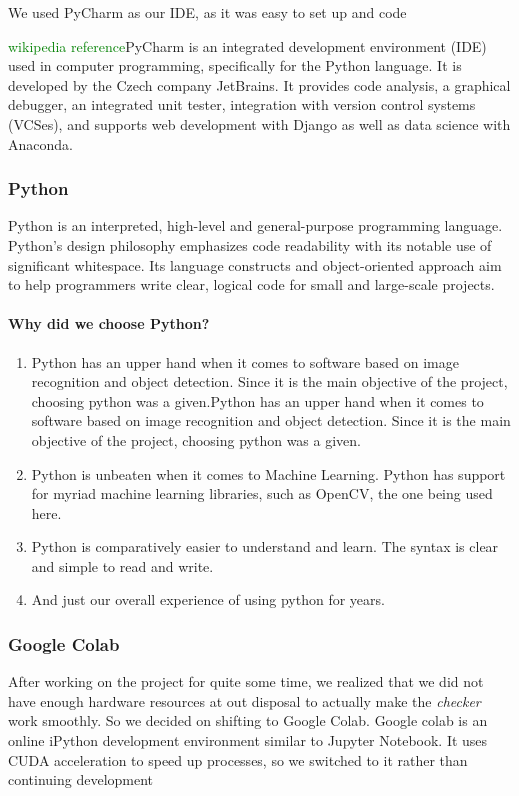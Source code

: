 \documentclass[a4paper]{article}
\begin{document}
We used PyCharm as our IDE, as it was easy to set up and code

\textcolor{green}{wikipedia reference}PyCharm is an integrated development environment (IDE) used in computer programming, specifically for the Python language. It is developed by the Czech company JetBrains. It provides code analysis, a graphical debugger, an integrated unit tester, integration with version control systems (VCSes), and supports web development with Django as well as data science with Anaconda.

\subsubsection{Python}
Python is an interpreted, high-level and general-purpose programming language.
Python's design philosophy emphasizes code readability with its notable use of
significant whitespace. Its language constructs and object-oriented approach aim
to help programmers write clear, logical code for small and large-scale projects.

\paragraph{Why did we choose Python?}
\begin{enumerate}
    \item Python has an upper hand when it comes to software based on
          image recognition and object detection. Since it is the main
          objective of the project, choosing python was a given.Python has an upper hand when it comes to software based on
          image recognition and object detection. Since it is the main
          objective of the project, choosing python was a given.
    \item Python is unbeaten when it comes to Machine Learning. Python has
          support for myriad machine learning libraries, such as OpenCV, the
          one being used here.
    \item Python is comparatively easier to understand and learn. The syntax
          is clear and simple to read and write.
    \item And just our overall experience of using python for years.
\end{enumerate}

\subsubsection{Google Colab}
After working on the project for quite some time, we realized that we did
not have enough hardware resources at out disposal to actually make the
\textit{checker} work smoothly. So we decided on shifting to Google Colab.
Google colab is an online iPython development environment similar to
Jupyter Notebook. It uses CUDA acceleration to speed up processes, so we
switched to it rather than continuing development
\end{document}
